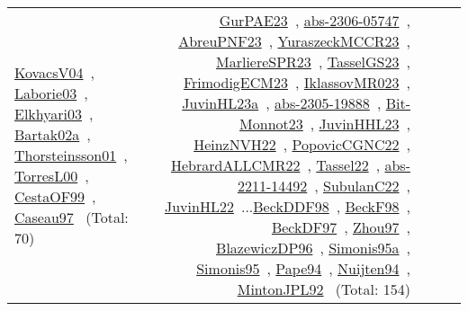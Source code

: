 {\begin{longtable}{p{3cm}r>{\raggedright\arraybackslash}p{6cm}>{\raggedright\arraybackslash}p{6cm}>{\raggedright\arraybackslash}p{8cm}}
\href{../works/KovacsV04.pdf}{KovacsV04}~\cite{KovacsV04}, \href{../works/Laborie03.pdf}{Laborie03}~\cite{Laborie03}, \href{../works/Elkhyari03.pdf}{Elkhyari03}~\cite{Elkhyari03}, \href{../works/Bartak02a.pdf}{Bartak02a}~\cite{Bartak02a}, \href{../works/Thorsteinsson01.pdf}{Thorsteinsson01}~\cite{Thorsteinsson01}, \href{../works/TorresL00.pdf}{TorresL00}~\cite{TorresL00}, \href{../works/CestaOF99.pdf}{CestaOF99}~\cite{CestaOF99}, \href{../works/Caseau97.pdf}{Caseau97}~\cite{Caseau97} (Total: 70) & \href{../works/GurPAE23.pdf}{GurPAE23}~\cite{GurPAE23}, \href{../works/abs-2306-05747.pdf}{abs-2306-05747}~\cite{abs-2306-05747}, \href{../works/AbreuPNF23.pdf}{AbreuPNF23}~\cite{AbreuPNF23}, \href{../works/YuraszeckMCCR23.pdf}{YuraszeckMCCR23}~\cite{YuraszeckMCCR23}, \href{../works/MarliereSPR23.pdf}{MarliereSPR23}~\cite{MarliereSPR23}, \href{../works/TasselGS23.pdf}{TasselGS23}~\cite{TasselGS23}, \href{../works/FrimodigECM23.pdf}{FrimodigECM23}~\cite{FrimodigECM23}, \href{../works/IklassovMR023.pdf}{IklassovMR023}~\cite{IklassovMR023}, \href{../works/JuvinHL23a.pdf}{JuvinHL23a}~\cite{JuvinHL23a}, \href{../works/abs-2305-19888.pdf}{abs-2305-19888}~\cite{abs-2305-19888}, \href{../works/Bit-Monnot23.pdf}{Bit-Monnot23}~\cite{Bit-Monnot23}, \href{../works/JuvinHHL23.pdf}{JuvinHHL23}~\cite{JuvinHHL23}, \href{../works/HeinzNVH22.pdf}{HeinzNVH22}~\cite{HeinzNVH22}, \href{../works/PopovicCGNC22.pdf}{PopovicCGNC22}~\cite{PopovicCGNC22}, \href{../works/HebrardALLCMR22.pdf}{HebrardALLCMR22}~\cite{HebrardALLCMR22}, \href{../works/Tassel22.pdf}{Tassel22}~\cite{Tassel22}, \href{../works/abs-2211-14492.pdf}{abs-2211-14492}~\cite{abs-2211-14492}, \href{../works/SubulanC22.pdf}{SubulanC22}~\cite{SubulanC22}, \href{../works/JuvinHL22.pdf}{JuvinHL22}~\cite{JuvinHL22}...\href{../works/BeckDDF98.pdf}{BeckDDF98}~\cite{BeckDDF98}, \href{../works/BeckF98.pdf}{BeckF98}~\cite{BeckF98}, \href{../works/BeckDF97.pdf}{BeckDF97}~\cite{BeckDF97}, \href{../works/Zhou97.pdf}{Zhou97}~\cite{Zhou97}, \href{../works/BlazewiczDP96.pdf}{BlazewiczDP96}~\cite{BlazewiczDP96}, \href{../works/Simonis95a.pdf}{Simonis95a}~\cite{Simonis95a}, \href{../works/Simonis95.pdf}{Simonis95}~\cite{Simonis95}, \href{../works/Pape94.pdf}{Pape94}~\cite{Pape94}, \href{../works/Nuijten94.pdf}{Nuijten94}~\cite{Nuijten94}, \href{../works/MintonJPL92.pdf}{MintonJPL92}~\cite{MintonJPL92} (Total: 154)\\

\end{longtable}}

